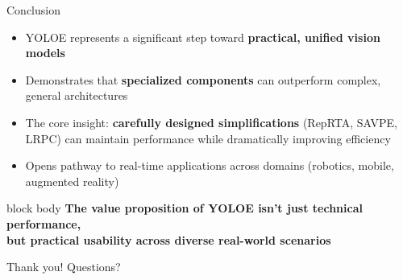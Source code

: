 \documentclass{beamer}
\begin{document}
\begin{frame}{Conclusion}
    \begin{itemize}
        \item YOLOE represents a significant step toward \textbf{practical, unified vision models}
        \item Demonstrates that \textbf{specialized components} can outperform complex, general architectures
        \item The core insight: \textbf{carefully designed simplifications} (RepRTA, SAVPE, LRPC) can maintain performance while dramatically improving efficiency
        \item Opens pathway to real-time applications across domains (robotics, mobile, augmented reality)
    \end{itemize}
    
    \vspace{0.3cm}
    
    \hfill
    \begin{beamercolorbox}[rounded=true,shadow=true,wd=0.9\textwidth,center]{block body}
        \textbf{The value proposition of YOLOE isn't just technical performance,\\but practical usability across diverse real-world scenarios}
    \end{beamercolorbox}
    \hfill\null

    \vspace{0.3cm}
    \centering
    \Large{Thank you! Questions?}
\end{frame}
\end{document}
